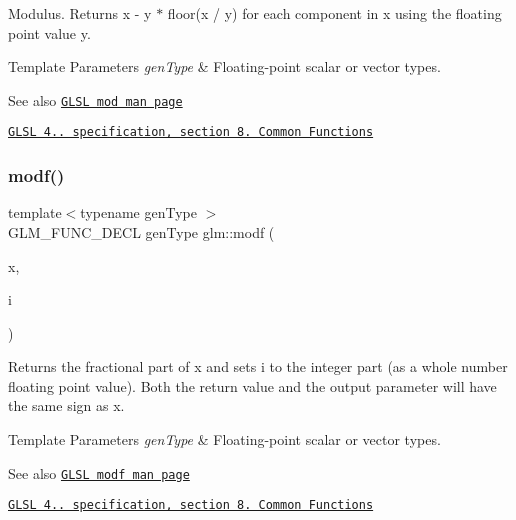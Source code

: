 Modulus. Returns x -\/ y $\ast$ floor(x / y) for each component in x using the floating point value y.


\begin{DoxyTemplParams}{Template Parameters}
{\em gen\+Type} & Floating-\/point scalar or vector types.\\
\hline
\end{DoxyTemplParams}
\begin{DoxySeeAlso}{See also}
\href{http://www.opengl.org/sdk/docs/manglsl/xhtml/mod.xml}{\tt G\+L\+SL mod man page} 

\href{http://www.opengl.org/registry/doc/GLSLangSpec.4.20.8.pdf}{\tt G\+L\+SL 4.. specification, section 8. Common Functions} 
\end{DoxySeeAlso}
\mbox{\label{group__core__func__common_ga85e33f139b8db1b39b590a5713b9e679}} 
\subsubsection{\texorpdfstring{modf()}{modf()}}
{\footnotesize\ttfamily template$<$typename gen\+Type $>$ \\
G\+L\+M\+\_\+\+F\+U\+N\+C\+\_\+\+D\+E\+CL gen\+Type glm\+::modf (\begin{DoxyParamCaption}\item[{gen\+Type}]{x,  }\item[{gen\+Type \&}]{i }\end{DoxyParamCaption})}

Returns the fractional part of x and sets i to the integer part (as a whole number floating point value). Both the return value and the output parameter will have the same sign as x.


\begin{DoxyTemplParams}{Template Parameters}
{\em gen\+Type} & Floating-\/point scalar or vector types.\\
\hline
\end{DoxyTemplParams}
\begin{DoxySeeAlso}{See also}
\href{http://www.opengl.org/sdk/docs/manglsl/xhtml/modf.xml}{\tt G\+L\+SL modf man page} 

\href{http://www.opengl.org/registry/doc/GLSLangSpec.4.20.8.pdf}{\tt G\+L\+SL 4.. specification, section 8. Common Functions} 
\end{DoxySeeAlso}
\mbox{\label{group__core__func__common_gada0165544c0618d634c8056a88082ce9}} 
